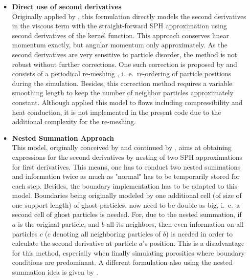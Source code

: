 \documentclass[11pt,a4paper,twoside]{report}
\begin{document}
\begin{itemize}
\item {\bf Direct use of second derivatives}\\
Originally applied by \cite{Flebbe1994, Watkins1996}, this formulation directly models the second derivatives in the viscous term with the straight-forward SPH approximation using second derivatives of the kernel function. This approach conserves linear momentum exactly, but angular momentum only approximately. As the second derivatives are very sensitive to particle disorder, the method is not robust without further corrections. One such correction is proposed by \cite{Chaniotis2002} and consists of a periodical re-meshing , i.\ e.\ re-ordering of particle positions during the simulation. Besides, this correction method requires a variable smoothing length to keep the number of neighbor particles approximately constant. Although \cite{Chaniotis2002} applied this model to flows including compressibility and heat conduction, it is not implemented in the present code due to the additional complexity for the re-meshing.

\item {\bf Nested Summation Approach}\\
This model, originally conceived by \cite{Flebbe1994} and continued by \cite{Speith1999}, aims at obtaining expressions for the second derivatives by nesting of two SPH approximations for first derivatives. This means, one has to conduct two nested summations and information twice as much as "normal" has to be temporarily stored for each step. Besides, the boundary implementation has to be adapted to this model. Boundaries being originally modeled by one additional cell (of size of one support length) of ghost particles, now need to be double as big, i.\ e.\ a second cell of ghost particles is needed. For, due to the nested summation, if $a$ is the original particle, and $b$ all its neighbors, then even information on all particles $c$ ($c$ denoting all neighboring particles of $b$) is needed in order to calculate the second derivative at particle $a$'s position.
This is a disadvantage for this method, especially when finally simulating porosities where boundary conditions are predominant.
A different formulation also using the nested summation idea is given by \cite{Watkins1996}.


\end{itemize}
\end{document}
